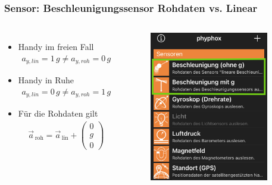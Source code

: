 \documentclass{beamer}
\begin{document}
\begin{frame}
    \frametitle{Sensor: Beschleunigungssensor Rohdaten vs. Linear}
    \begin{columns}
        \begin{itemize}
            \item Handy im freien Fall 
                \begin{align*}
                    a_{y,lin}=1\,g \neq a_{y,roh}=0\,g
                \end{align*}   
            \item Handy in Ruhe 
                \begin{align*}
                    a_{y,lin}=0\,g \neq a_{y,roh}=1\,g
                \end{align*} 
            \item Für die Rohdaten gilt
                \begin{align*}
                    \vec{a}_{\,\text{roh}} = \vec{a}_{\,\text{lin}}+\begin{pmatrix}0\\g\\0 \end{pmatrix}
                \end{align*}
        \end{itemize}
        \begin{figure}[htpb]
            \centering
            \includegraphics[width=0.9\textwidth]{acc_phyphox}
        \end{figure}
    \end{columns}

\end{frame}
\end{document}
